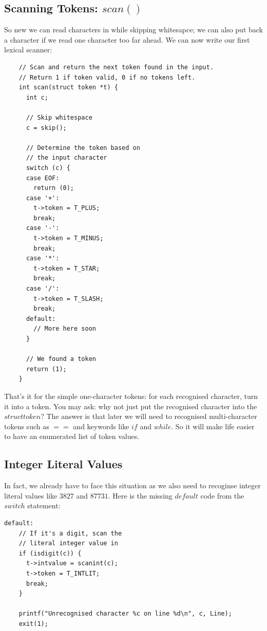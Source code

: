 \documentclass[a4paper,12pt]{article}
\begin{document}
\subsection{Scanning Tokens: $scan()$}

So new we can read characters in while skipping whitesapce; we can also put back a character if we read one character too far ahead. We can now write our first lexical scanner:

\begin{lstlisting}
    // Scan and return the next token found in the input.
    // Return 1 if token valid, 0 if no tokens left.
    int scan(struct token *t) {
      int c;
    
      // Skip whitespace
      c = skip();
    
      // Determine the token based on
      // the input character
      switch (c) {
      case EOF:
        return (0);
      case '+':
        t->token = T_PLUS;
        break;
      case '-':
        t->token = T_MINUS;
        break;
      case '*':
        t->token = T_STAR;
        break;
      case '/':
        t->token = T_SLASH;
        break;
      default:
        // More here soon
      }
    
      // We found a token
      return (1);
    }    
\end{lstlisting}

That's it for the simple one-character tokens: for each recognised character, turn it into a token. You may ask: why not just put the recognised character into the $struct token$? The answer is that later we will need to recognised multi-character tokens such as $==$ and keywords like $if$ and $while$. So it will make life easier to have an enumerated list of token values.

\subsection{Integer Literal Values}

In fact, we already have to face this situation as we also need to recoginse integer literal values like $3827$ and $87731$. Here is the missing $default$ code from the $switch$ statement:

\begin{lstlisting}
default:
    // If it's a digit, scan the
    // literal integer value in
    if (isdigit(c)) {
      t->intvalue = scanint(c);
      t->token = T_INTLIT;
      break;
    }

    printf("Unrecognised character %c on line %d\n", c, Line);
    exit(1);
\end{lstlisting}
\end{document}
